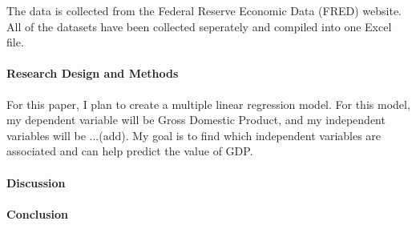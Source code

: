 \documentclass[12pt]{article}
\begin{document}
The data is collected from the Federal Reserve Economic Data (FRED) website. All of the datasets have been collected seperately and compiled into one Excel file. 

\paragraph{Research Design and Methods}
For this paper, I plan to create a multiple linear regression model. 
For this model, my dependent variable will be Gross Domestic Product, and my independent variables will be ...(add). 
My goal is to find which independent variables are associated and can help predict the value of GDP. 



\paragraph{Discussion}
\lipsum[5] \citep{wild2004global}

\paragraph{Conclusion}
\lipsum[1]




\end{document}
